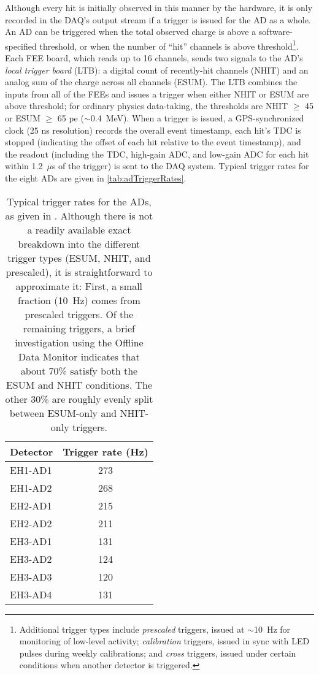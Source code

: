 \documentclass[../thesis.tex]{subfiles}
\begin{document}
Although every hit is initially observed in this manner by the hardware, it is only recorded in the DAQ's output stream if a trigger is issued for the AD as a whole. An AD can be triggered when the total observed charge is above a software-specified threshold, or when the number of ``hit'' channels is above threshold\footnote{Additional trigger types include \emph{prescaled} triggers, issued at $\sim$10~Hz for monitoring of low-level activity; \emph{calibration} triggers, issued in sync with LED pulses during weekly calibrations; and \emph{cross} triggers, issued under certain conditions when another detector is triggered.}. Each FEE board, which reads up to 16 channels, sends two signals to the AD's \emph{local trigger board} (LTB): a digital count of recently-hit channels (NHIT) and an analog sum of the charge across all channels (ESUM). The LTB combines the inputs from all of the FEEs and issues a trigger when either NHIT or ESUM are above threshold; for ordinary physics data-taking, the thresholds are NHIT $\geq$ 45 or ESUM $\geq$ 65 pe ($\sim$0.4~MeV). When a trigger is issued, a GPS-synchronized clock (25 ns resolution) records the overall event timestamp, each hit's TDC is stopped (indicating the offset of each hit relative to the event timestamp), and the readout (including the TDC, high-gain ADC, and low-gain ADC for each hit within 1.2~$\mu$s of the trigger) is sent to the DAQ system. Typical trigger rates for the eight ADs are given in \autoref{tab:adTriggerRates}.

\begin{table}[h]
  \begin{tabular}{lc}
    \toprule
    Detector & Trigger rate (Hz) \\
    \midrule
    EH1-AD1 & 273 \\
    EH1-AD2 & 268 \\
    \midrule
    EH2-AD1 & 215 \\
    EH2-AD2 & 211 \\
    \midrule
    EH3-AD1 & 131 \\
    EH3-AD2 & 124 \\
    EH3-AD3 & 120 \\
    EH3-AD4 & 131 \\
    \bottomrule
  \end{tabular}
  \caption{Typical trigger rates for the ADs, as given in \cite{AN2016133}. Although there is not a readily available exact breakdown into the different trigger types (ESUM, NHIT, and prescaled), it is straightforward to approximate it: First, a small fraction (10~Hz) comes from prescaled triggers. Of the remaining triggers, a brief investigation using the Offline Data Monitor indicates that about 70\% satisfy both the ESUM and NHIT conditions. The other 30\% are roughly evenly split between ESUM-only and NHIT-only triggers.}
  \label{tab:adTriggerRates}
\end{table}
\end{document}
